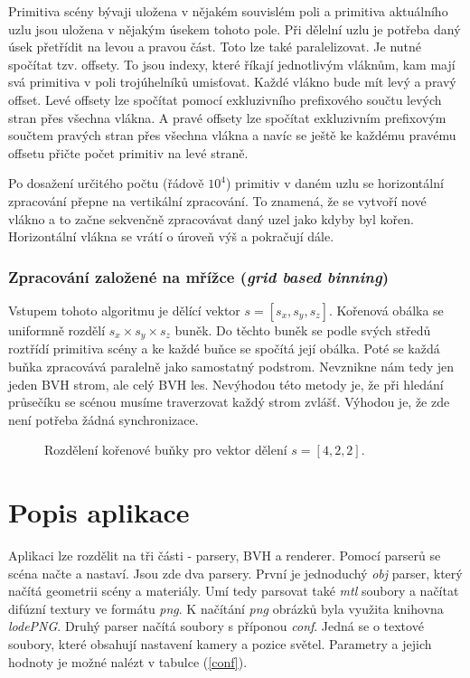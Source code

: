 \documentclass[11pt]{article}
\begin{document}
Primitiva scény bývaji uložena v nějakém souvislém poli a primitiva aktuálního uzlu jsou uložena v nějakým úsekem tohoto pole. Při dělelní uzlu je potřeba daný úsek přetřídit na levou a pravou část. Toto lze také paralelizovat. Je nutné spočítat tzv. offsety. To jsou indexy, které říkají jednotlivým vláknům, kam mají svá primitiva v poli trojúhelníků umisťovat. Každé vlákno bude mít levý a pravý offset. Levé offsety lze spočítat pomocí exkluzivního prefixového součtu levých stran přes všechna vlákna. A pravé offsety lze spočítat exkluzivním prefixovým součtem pravých stran přes všechna vlákna a navíc se ještě ke každému pravému offsetu přičte počet primitiv na levé straně.

Po dosažení určitého počtu (řádově $10^4$) primitiv v daném uzlu se horizontální zpracování přepne na vertikální zpracování. To znamená, že se vytvoří nové vlákno a to začne sekvenčně zpracovávat daný uzel jako kdyby byl kořen. Horizontální vlákna se vrátí o úroveň výš a pokračují dále.

\subsubsection{Zpracování založené na mřížce (\emph{grid based binning})}
Vstupem tohoto algoritmu je dělící vektor $s = [s_x, s_y, s_z]$. Kořenová obálka se uniformně rozdělí $s_x \times s_y \times s_z$ buněk. Do těchto buněk se podle svých středů roztřídí primitiva scény a ke každé buňce se spočítá její obálka. Poté se každá buňka zpracovává paralelně jako samostatný podstrom. Nevznikne nám tedy jen jeden BVH strom, ale celý BVH les. Nevýhodou této metody je, že při hledání průsečíku se scénou musíme traverzovat každý strom zvlášť. Výhodou je, že zde není potřeba žádná synchronizace.

\begin{figure}[h]
\setlength\fboxsep{1pt}
\centerline{}
\caption{Rozdělení kořenové buňky pro vektor dělení $s = [4, 2, 2]$.}
\label{grid}
\end{figure}

\section{Popis aplikace}
Aplikaci lze rozdělit na tři části - parsery, BVH a renderer. Pomocí parserů se scéna načte a nastaví. Jsou zde dva parsery. První je jednoduchý \emph{obj} parser, který načítá geometrii scény a materiály. Umí tedy parsovat také \emph{mtl} soubory a načítat difúzní textury ve formátu \emph{png}. K načítání \emph{png} obrázků byla využita knihovna \emph{lodePNG}. Druhý parser načítá soubory s příponou \emph{conf}. Jedná se o textové soubory, které obsahují nastavení kamery a pozice světel. Parametry a jejich hodnoty je možné nalézt v tabulce (\ref{conf}).
\end{document}
